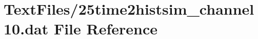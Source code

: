 \hypertarget{25time2histsim__channel10_8dat}{}\section{Text\+Files/25time2histsim\+\_\+channel10.dat File Reference}
\label{25time2histsim__channel10_8dat}

